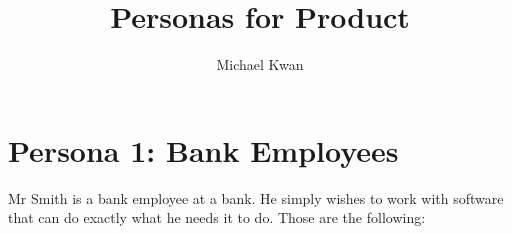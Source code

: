\documentclass[hidelinks, 12pt]{article}    %
\title{Personas for Product}
\author{Michael Kwan}
\begin{document}
    \section{Persona 1: Bank Employees}
        Mr Smith is a bank employee at a bank. He simply wishes to work with
        software that can do exactly what he needs it to do. Those are the
        following:
\end{document}
